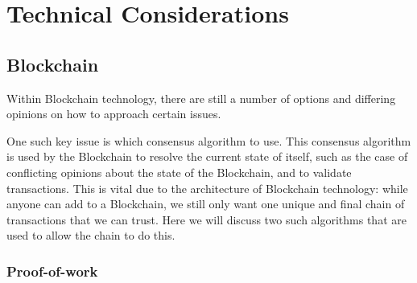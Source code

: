 \documentclass{article}
\begin{document}
\section{Technical Considerations}

\subsection{Blockchain}

Within Blockchain technology, there are still a number of options and differing opinions on how to approach certain issues.

\par

One such key issue is which consensus algorithm to use. This consensus algorithm is used by the Blockchain to resolve the current state of itself, such as the case of conflicting opinions about the state of the Blockchain, and to validate transactions. This is vital due to the architecture of Blockchain technology: while anyone can add to a Blockchain, we still only want one unique and final chain of transactions that we can trust. Here we will discuss two such algorithms that are used to allow the chain to do this.

\subsubsection{Proof-of-work}
\end{document}
